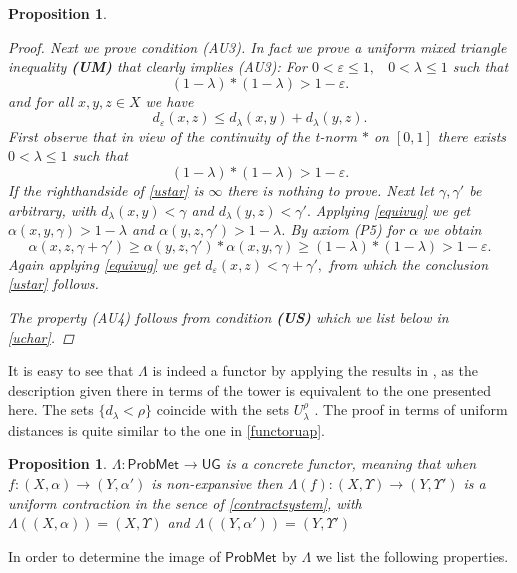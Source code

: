 \documentclass[12pt,a4paper]{amsart}
\theoremstyle{theorem}
\newtheorem{proposition}[theorem]{Proposition}
\theoremstyle{definition}
\newcommand{\PM}{\ensuremath{\mathsf{ProbMet_{}}}}
\newcommand{\ug}{\ensuremath{\mathsf{UG}}}
\renewcommand{\a}{\ensuremath{\alpha}}
\newcommand{\ve}{\ensuremath{\varepsilon}}
\renewcommand{\l}{\ensuremath{\lambda}}
\def\rw{\rightarrow}
\begin{document}
{\begin{proposition}
\begin{proof}
Next we prove condition (AU3). In fact we prove a \emph{uniform mixed triangle inequality} {\bf(UM)}
that clearly implies (AU3):
For $0 < \ve \leq 1,$ \ 
$0<\l \leq 1$ such that 
$$
(1-\l) * (1-\l) > 1 - \ve.
$$
and for all $x,y,z \in X$ we have
\begin{equation}\label{ustar}
d_\ve (x,z) \leq d_{\l }(x,y) + d_{\l }(y,z).
\end{equation}
First observe that in view of the continuity of the t-norm $*$ on $[0,1]$ there exists $0<\l \leq 1$ such that 
$$
(1-\l) * (1-\l) > 1 - \ve.
$$
If the righthandside of \eqref{ustar} is $\infty$ there is nothing to prove. 
Next let $\gamma, \gamma'$ be arbitrary, with $d_{\l}(x,y) < \gamma$ and $d_{\l} (y, z) <\gamma'.$
Applying \eqref{equivug} we get $\a(x,y,\gamma) > 1 - \l$ and $\a(y,z,\gamma') > 1 - \l$.
By axiom (P5) for $\a$ we obtain 
$$
\a(x,z, \gamma + \gamma') \geq \a(y,z,\gamma') * \a(x,y,\gamma) \geq (1-\l) * (1-\l) > 1 - \ve.
$$
Again applying \eqref{equivug} we get $ d_\ve (x,z) < \gamma + \gamma',$ from which the conclusion \eqref{ustar} follows.

The property (AU4) follows from condition {\bf(US)} which we list below in \ref{uchar}.

\end{proof}
\end{proposition}

It is easy to see that $\Lambda$ is indeed a functor by applying the results in \cite{CL}, as the description given there in terms of the tower is equivalent to the one presented here. The sets $\{d_\l < \rho\}$ coincide with the sets $U_\l^\rho$ \cite{CL}.
The proof  in terms of uniform distances is quite similar to the one in \ref{functoruap}.

\begin{proposition}\label{uimage}
$\Lambda: \PM \rw \ug$ is a concrete functor, meaning that when $f: (X,\a) \rw (Y, \a')$ is non-expansive then  $\Lambda(f) : (X, \Upsilon) \rw (Y, \Upsilon')$ is a uniform contraction in the sence of \eqref{contractsystem}, with $\Lambda((X,\a)) = (X, \Upsilon)$ and $\Lambda((Y,\a')) = (Y, \Upsilon')$
\end{proposition}



In order to determine the image of $\PM$ by $\Lambda$ we list the following properties.

}
\end{document}

